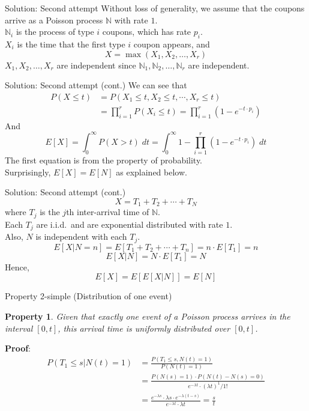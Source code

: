 \documentclass[mathserif]{beamer}
\newtheorem{pty}{Property}
\begin{document}
\begin{frame}{Solution: Second attempt}
Without loss of generality, we assume that the coupons arrive as a Poisson process $\mathbb{N}$ with rate $1$.\\
$\mathbb{N}_i$ is the process of type $i$ coupons, which has rate $p_i$.\\
$X_i$ is the time that the first type $i$ coupon appears, and
\[
X = \max(X_1, X_2, \ldots, X_r)
\]
$X_1, X_2, \ldots, X_r$ are independent since $\mathbb{N}_1, \mathbb{N}_2, \ldots, \mathbb{N}_r$ are independent.
\end{frame}

\begin{frame}{Solution: Second attempt (cont.)}
We can see that
\begin{align*}
P(X\leq t) & = P(X_1\leq t, X_2\leq t, \cdots, X_r\leq t) \\
& = \prod_{i=1}^r P(X_i\leq t) = \prod_{i=1}^r (1 - e^{-t\cdot p_i})
\end{align*}
And
\[
E[X] = \int_0^\infty P(X > t)\; dt = \int_0^\infty 1 - \prod_{i=1}^r (1 - e^{-t\cdot p_i})\; dt
\]
The first equation is from the property of probability.\\
Surprisingly, $E[X] = E[N]$ as explained below.
\end{frame}

\begin{frame}{Solution: Second attempt (cont.)}
\[
X = T_1 + T_2 + \cdots + T_N
\]
where $T_j$ is the $j$th inter-arrival time of $\mathbb{N}$.\\
Each $T_j$ are i.i.d.\ and are exponential distributed with rate $1$.\\
Also, $N$ is independent with each $T_j$.
\[
E[X|N=n] = E[T_1 + T_2 + \cdots + T_n] = n\cdot E[T_1] = n
\]
\[
E[X|N] = N\cdot E[T_1] = N
\]
Hence,
\[
E[X] = E[E[X|N]] = E[N]
\]
\end{frame}

\begin{frame}{Property 2-simple (Distribution of one event)}
\begin{pty}
Given that exactly one event of a Poisson process arrives in the interval $[0,t]$,
this arrival time is uniformly distributed over $[0,t]$.
\end{pty}
\textbf{Proof}:
\begin{align*}
P(T_1\leq s | N(t)=1) & = \frac{P(T_1\leq s, N(t)=1)}{P(N(t)=1)} \\
& = \frac{P(N(s)=1)\cdot P(N(t)-N(s)=0)}{e^{-\lambda t}\cdot (\lambda t)^1 / 1!}\\
& = \frac{e^{-\lambda s}\cdot \lambda s \cdot e^{-\lambda(t-s)}}{e^{-\lambda t}\cdot \lambda t}
= \frac{s}{t}
\end{align*}
\end{frame}
\end{document}
